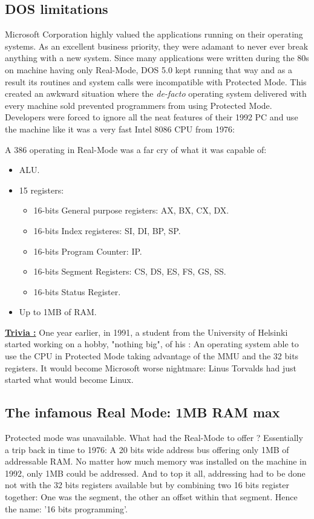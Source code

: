 \documentclass[book.tex]{subfiles}
\begin{document}
  \subsection{DOS limitations}
  Microsoft Corporation highly valued the applications running on their operating systems. As an excellent business priority, they were adamant to never ever break anything with a new system.  Since many applications were written during the 80s on machine having only Real-Mode, DOS 5.0 kept running that way and as a result its routines and system calls were incompatible with Protected Mode. This created an awkward situation where the \emph{de-facto} operating system delivered with every machine sold prevented programmers from using Protected Mode. Developers were forced to ignore all the neat features of their 1992 PC and use the machine like it was a very fast Intel 8086 CPU from 1976:\\
\par
  A 386 operating in Real-Mode was a far cry of what it was capable of:\\
\begin{itemize}
\item ALU.
\item 15 registers:
\begin{itemize}
  \item 16-bits General purpose registers: AX, BX, CX, DX.
  \item 16-bits Index registeres: SI, DI, BP, SP.
  \item 16-bits Program Counter: IP.
  \item 16-bits Segment Registers: CS, DS, ES, FS, GS, SS.
  \item 16-bits Status Register.
\end{itemize}
\item Up to 1MB of RAM.
\end{itemize}


\bigskip

 \textbf{\underline{Trivia :}} One year earlier, in 1991, a student from the University of Helsinki started working on a hobby, "nothing big", of his : An operating system able to use the CPU in Protected Mode taking advantage of the MMU and the 32 bits registers. It would become Microsoft worse nightmare: Linus Torvalds had just started what would become Linux.



  \subsection{The infamous Real Mode: 1MB RAM max}
  Protected mode was unavailable. What had the Real-Mode to offer ? Essentially a trip back in time to 1976: A 20 bits wide address bus offering only 1MB of addressable RAM. No matter how much memory was installed on the machine in 1992, only 1MB could be addressed. And to top it all, addressing had to be done not with the 32 bits registers available but by combining two 16 bits register together: One was the segment, the other an offset within that segment. Hence the name: '16 bits programming'.
\end{document}
